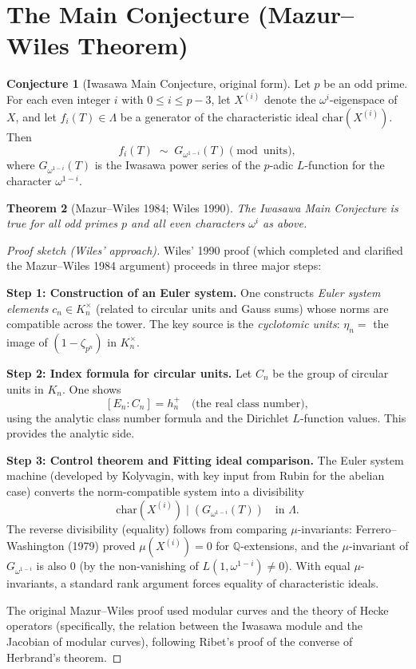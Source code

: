 \documentclass[12pt,a4paper]{amsart}
\newtheorem{theorem}{Theorem}[section]
\theoremstyle{definition}
\newtheorem{conjecture}[theorem]{Conjecture}
\newcommand{\Q}{\mathbb{Q}}
\begin{document}
\section{The Main Conjecture (Mazur--Wiles Theorem)}

\begin{conjecture}[Iwasawa Main Conjecture, original form]
\label{conj:main}
Let $p$ be an odd prime.  For each even integer $i$ with $0 \le i \le p-3$,
let $X^{(i)}$ denote the $\omega^i$-eigenspace of $X$, and let
$f_i(T) \in \Lambda$ be a generator of the characteristic ideal
$\mathrm{char}(X^{(i)})$.  Then
\[
  f_i(T) \;\sim\; G_{\omega^{1-i}}(T) \pmod{\mathrm{units}},
\]
where $G_{\omega^{1-i}}(T)$ is the Iwasawa power series of the $p$-adic
$L$-function for the character $\omega^{1-i}$.
\end{conjecture}

\begin{theorem}[Mazur--Wiles 1984; Wiles 1990]
\label{thm:mazur_wiles}
The Iwasawa Main Conjecture is true for all odd primes $p$ and all
even characters $\omega^i$ as above.
\end{theorem}

\begin{proof}[Proof sketch (Wiles' approach)]
Wiles' 1990 proof (which completed and clarified the Mazur--Wiles 1984
argument) proceeds in three major steps:

\textbf{Step 1: Construction of an Euler system.}
One constructs \emph{Euler system elements} $c_n \in K_n^\times$ (related
to circular units and Gauss sums) whose norms are compatible across the tower.
The key source is the \emph{cyclotomic units}:
$\eta_n = $ the image of $(1 - \zeta_{p^n})$ in $K_n^\times$.

\textbf{Step 2: Index formula for circular units.}
Let $C_n$ be the group of circular units in $K_n$.  One shows
\[
  [E_n : C_n] = h_n^+ \quad\text{(the real class number)},
\]
using the analytic class number formula and the Dirichlet $L$-function values.
This provides the analytic side.

\textbf{Step 3: Control theorem and Fitting ideal comparison.}
The Euler system machine (developed by Kolyvagin, with key input from
Rubin for the abelian case) converts the norm-compatible system into
a divisibility
\[
  \mathrm{char}(X^{(i)}) \mid (G_{\omega^{1-i}}(T)) \quad \text{in } \Lambda.
\]
The reverse divisibility (equality) follows from comparing $\mu$-invariants:
Ferrero--Washington (1979) proved $\mu(X^{(i)}) = 0$ for $\Q$-extensions,
and the $\mu$-invariant of $G_{\omega^{1-i}}$ is also $0$ (by the non-vanishing
of $L(1, \omega^{1-i}) \ne 0$).  With equal $\mu$-invariants, a standard
rank argument forces equality of characteristic ideals.

The original Mazur--Wiles proof used modular curves and the theory of
Hecke operators (specifically, the relation between the Iwasawa module and
the Jacobian of modular curves), following Ribet's proof of the converse
of Herbrand's theorem.
\end{proof}
\end{document}
